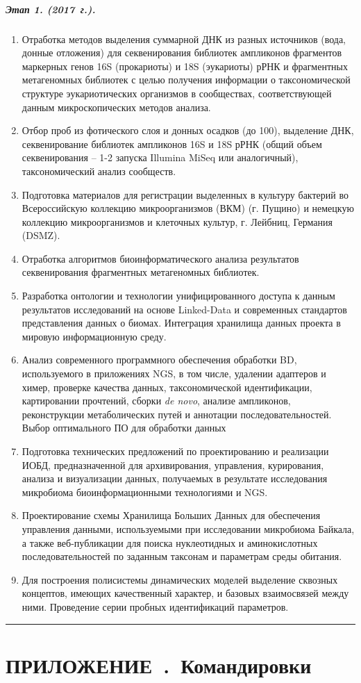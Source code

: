 \documentclass[a4paper,12pt,openany,final]{extreport}
\makeatletter
\newcommand\theyear{2017}
\def\vhrulefill#1{\leavevmode\leaders\hrule\@height#1\hfill \kern\z@}
\newcommand\bottomrule{\noindent\vhrulefill{2pt}}
\providecommand{\appendixname}{}
\renewcommand{\appendixname}{ПРИЛОЖЕНИЕ}
\newcommand{\theappendix}{\Roman{appsnum}}
\newcommand{\appchapter}[1]{%
\stepcounter{appsnum}\chapter*{\appendixname~\theappendix.~#1}%
}
\makeatother
\begin{document}
\paragraph{Этап 1. (\theyear~г.).}
\begin{enumerate}
\item Отработка методов выделения суммарной ДНК из разных
  источников (вода, донные отложения) для секвенирования библиотек
  ампликонов фрагментов маркерных генов 16S (прокариоты) и 18S
  (эукариоты) рРНК и фрагментных метагеномных библиотек с целью
  получения информации о таксономической структуре эукариотических
  организмов в сообществах, соответствующей данным микроскопических
  методов анализа.

\item  Отбор проб из фотического слоя и донных осадков (до 100), выделение
ДНК, секвенирование библиотек ампликонов 16S и 18S рРНК (общий объем
секвенирования -- 1-2 запуска Illumina MiSeq или аналогичный),
таксономический анализ сообществ.

\item  Подготовка материалов для регистрации выделенных в культуру бактерий
во Всероссийскую коллекцию микроорганизмов (ВКМ) (г. Пущино) и немецкую
коллекцию микроорганизмов и клеточных культур, г. Лейбниц, Германия
(DSMZ).

\item Отработка алгоритмов биоинформатического анализа результатов
секвенирования фрагментных метагеномных библиотек.

\item  Разработка онтологии и технологии унифицированного доступа к данным
результатов исследований на основе Linked-Data и современных стандартов
представления данных о биомах. Интеграция хранилища данных проекта в
мировую информационную среду.

\item  Анализ современного программного обеспечения обработки BD,
используемого в приложениях NGS, в том числе, удалении адаптеров и
химер, проверке качества данных, таксономической идентификации,
картировании прочтений, сборки \textit{de novo}, анализе ампликонов,
реконструкции метаболических путей и аннотации последовательностей.
Выбор оптимального ПО для обработки данных

\item  Подготовка технических предложений по проектированию и реализации
ИОБД, предназначенной для архивирования, управления, курирования,
анализа и визуализации данных, получаемых в результате исследования
микробиома биоинформационными технологиями и NGS.

\item  Проектирование схемы Хранилища Больших Данных для обеспечения
управления данными, используемыми при исследовании микробиома Байкала, а
также веб-публикации для поиска нуклеотидных и аминокислотных
последовательностей по заданным таксонам и параметрам среды обитания.

\item  Для построения полисистемы динамических моделей выделение сквозных
концептов, имеющих качественный характер, и базовых взаимосвязей между
ними. Проведение серии пробных идентификаций параметров.\strut
\end{enumerate}
\bottomrule


\appchapter{Командировки}
\label{chap:comm}
\end{document}
